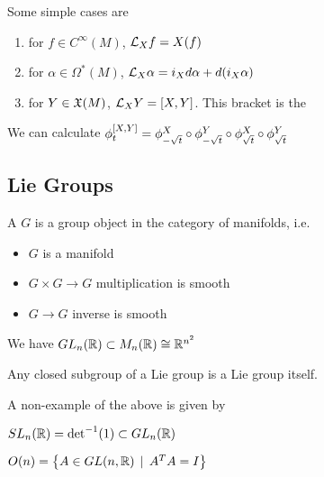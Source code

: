 \documentclass{article}
\begin{document}
Some simple cases are 
\begin{enumerate}
    \item for $f \in C^\infty(M)$, $\mc{L}_X f = X(f)$
    \item for $\alpha \in \Omega^\ast(M)$, $\mc{L}_X \alpha = i_X d\alpha + d(i_X \alpha)$
    \item for $Y \in \mf{X}(M)$, $\mc{L}_X Y = \comm[X]{Y}$. This bracket is the 
\end{enumerate}

We can calculate $\phi^{\comm[X]{Y}}_t = \phi^X_{-\sqrt{t}} \circ \phi^Y_{-\sqrt{t}} \circ \phi^X_{\sqrt{t}} \circ \phi^Y_{\sqrt{t}}$

\subsection{Lie Groups}

\begin{definition}
A  $G$ is a group object in the category of manifolds, i.e. 
\begin{itemize}
    \item $G$ is a manifold
    \item $G \times G \to G$ multiplication is smooth 
    \item $G \to G$ inverse is smooth
\end{itemize}
\end{definition}

\begin{example}
We have $GL_n(\mbb{R})\subset M_n(\mbb{R}) \cong \mbb{R}^{n^2}$
\end{example}

\begin{theorem}[Cartan]
Any closed subgroup of a Lie group is a Lie group itself. 
\end{theorem}

\begin{example}
A non-example of the above is given by 
\end{example}

\begin{example}
$SL_n(\mbb{R}) = \det^{-1}(1) \subset GL_n(\mbb{R})$
\end{example}

\begin{example}
$O(n) = \pbrace{A \in GL(n,\mbb{R}) \, \mid \, A^T A = I}$
\end{example}
\end{document}
